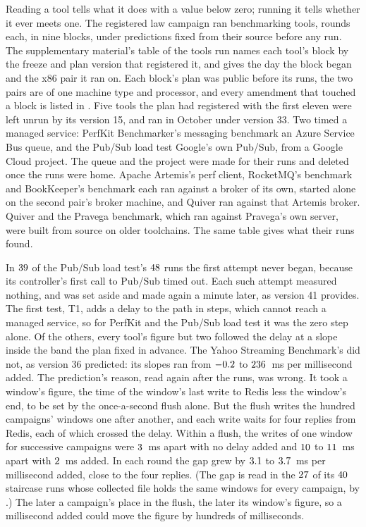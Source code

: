 \documentclass[10pt,journal,onecolumn]{IEEEtran}
\begin{document}
Reading a tool tells what it does with a value below zero; running it tells
whether it ever meets one. The registered law campaign ran \toolsRunWord{} benchmarking tools,
\toolsRoundsWord{} rounds each, in nine blocks, under predictions fixed from their source before
any run. The supplementary material's table of the tools run names each tool's block by the freeze and plan version that
registered it, and gives the day the block began and the x86 pair it ran on. Each block's plan was
public before its runs, the two pairs are of one machine type and processor, and every amendment
that touched a block is listed in . Five tools the plan had registered with
the first eleven were left unrun by its version 15, and ran in October under version 33. Two timed
a managed service: PerfKit Benchmarker's messaging benchmark an Azure Service Bus queue, and the
Pub/Sub load test Google's own Pub/Sub, from a Google Cloud project. The queue and the project were
made for their runs and deleted once the runs were home. Apache Artemis's perf client, RocketMQ's benchmark and BookKeeper's benchmark each ran
against a broker of its own, started alone on the second pair's broker machine, and Quiver ran
against that Artemis broker. Quiver and the Pravega benchmark, which ran against Pravega's own
server, were built from source on older toolchains. The same table gives what their
runs found.

In $39$ of the Pub/Sub load test's $48$ runs the first attempt
never began, because its controller's first call to Pub/Sub timed out. Each such attempt measured
nothing, and was set aside and made again a minute later, as version 41 provides. The first test,
T1, adds a delay to the path in steps, which cannot reach a managed service, so for PerfKit and the
Pub/Sub load test it was the zero step alone. Of the others, every tool's figure but two followed the delay at a slope inside the band the plan
fixed in advance. The Yahoo Streaming
Benchmark's did not, as version 36 predicted: its slopes ran from $-0.2$ to
$236$~ms per millisecond added. The prediction's reason, read again after the runs,
was wrong. It took a window's figure, the time of the window's last write to Redis less the
window's end, to be set by the once-a-second flush alone. But the flush writes the hundred
campaigns' windows one after another, and each write waits for four replies from Redis, each of
which crossed the delay. Within a flush, the writes of one window for successive campaigns were
$3$~ms apart with no delay added and $10$ to $11$~ms
apart with $2$~ms added. In each round the gap grew by $3.1$ to
$3.7$~ms per millisecond added, close to the four replies. (The gap is read in the
$27$ of its $40$ staircase runs whose collected file holds the same
windows for every campaign, by .) The later a campaign's place in the
flush, the later its window's figure, so a millisecond added could move the figure by hundreds of
milliseconds.
\end{document}
